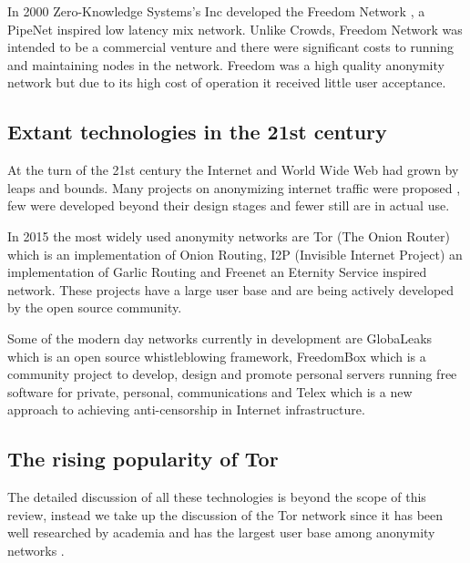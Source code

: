 \documentclass{llncs}
\begin{document}
In 2000 Zero-Knowledge Systems's Inc developed the Freedom Network \cite{freedom2-arch}, a PipeNet inspired low latency mix network. Unlike Crowds, Freedom Network was intended to be a commercial venture and there were significant costs to running and maintaining nodes in the network. Freedom was a high quality anonymity network but due to its high cost of operation it received little user acceptance.

\subsection{Extant technologies in the 21st century}

At the turn of the 21st century the Internet and World Wide Web had grown by leaps and bounds. Many projects on anonymizing internet traffic were proposed \cite{goldberg97privacyenhancing} \cite{fiveyearslater}, few were developed beyond their design stages and fewer still are in actual use.

In 2015 the most widely used anonymity networks are Tor (The Onion Router) \cite{tor-design} which is an implementation of Onion Routing, I2P (Invisible Internet Project) \cite{delmer-mthesis} an implementation of Garlic Routing and Freenet \cite{freenet} an Eternity Service inspired network. These projects have a large user base and are being actively developed by the open source community.

Some of the modern day networks currently in development are GlobaLeaks \cite{globaleaks} which is an open source whistleblowing framework, FreedomBox \cite{freedom-box} which is a community project to develop, design and promote personal servers running free software for private, personal, communications and Telex \cite{telex11} which is a new approach to achieving anti-censorship in Internet infrastructure. 

\subsection{The rising popularity of Tor}
The detailed discussion of all these technologies is beyond the scope of this review, instead we take up the discussion of the Tor network since it has been well researched by academia and has the largest user base among anonymity networks \cite{tor-metrics}.
\end{document}
